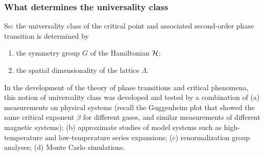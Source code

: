 \begin{diagram}
\end{diagram}

\subsubsection*{What determines the universality class}

So: the universality class of the critical point and associated second-order phase
transition is determined by
\begin{enumerate}[label=(\arabic*)]
  \item the symmetry group $G$ of the Hamiltonian $\mathcal{H}$;
  \item the spatial dimensionality of the lattice $\Lambda$.
\end{enumerate}
In the development of the theory of phase transitions and critical phenomena, this
notion of universality class was developed and tested by a combination of (a)
measurements on physical systems (recall the Guggenheim plot that showed the same
critical exponent $\beta$ for different gases, and similar measurements of different
magnetic systems); (b) approximate studies of model systems such as high-temperature
and low-temperature series expansions; (c) renormalization group analyses; (d) Monte
Carlo simulations.

